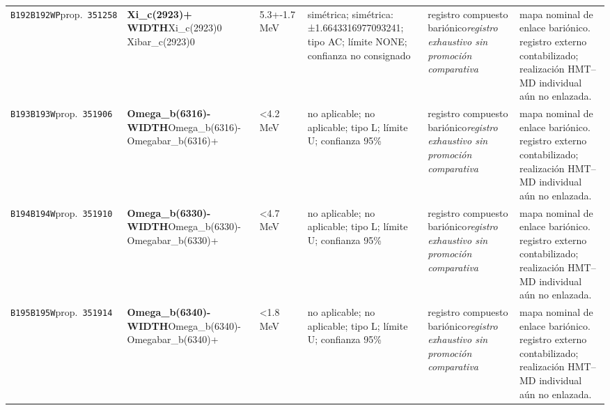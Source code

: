\begin{landscape}
\begin{longtable}{L{1.85cm}L{4.45cm}L{2.35cm}L{4.05cm}L{3.35cm}L{7.15cm}}
\texttt{B192}\newline \texttt{B192WP}\newline prop.\ \texttt{351258} & \textbf{Xi\_\allowbreak{}c(2923)+ WIDTH}\newline Xi\_\allowbreak{}c(2923)0 \textbar{}\allowbreak{} Xibar\_\allowbreak{}c(2923)0 & 5.3+-1.7\,MeV & simétrica; simétrica: ±1.6643316977093241; tipo AC; límite NONE; confianza no consignado & registro compuesto bariónico\newline \emph{registro exhaustivo sin promoción comparativa} & mapa nominal de enlace bariónico. registro externo contabilizado; realización HMT--MD individual aún no enlazada. \\
\texttt{B193}\newline \texttt{B193W}\newline prop.\ \texttt{351906} & \textbf{Omega\_\allowbreak{}b(6316)- WIDTH}\newline Omega\_\allowbreak{}b(6316)- \textbar{}\allowbreak{} Omegabar\_\allowbreak{}b(6316)+ & \textless{}4.2\,MeV & no aplicable; no aplicable; tipo L; límite U; confianza 95\% & registro compuesto bariónico\newline \emph{registro exhaustivo sin promoción comparativa} & mapa nominal de enlace bariónico. registro externo contabilizado; realización HMT--MD individual aún no enlazada. \\
\texttt{B194}\newline \texttt{B194W}\newline prop.\ \texttt{351910} & \textbf{Omega\_\allowbreak{}b(6330)- WIDTH}\newline Omega\_\allowbreak{}b(6330)- \textbar{}\allowbreak{} Omegabar\_\allowbreak{}b(6330)+ & \textless{}4.7\,MeV & no aplicable; no aplicable; tipo L; límite U; confianza 95\% & registro compuesto bariónico\newline \emph{registro exhaustivo sin promoción comparativa} & mapa nominal de enlace bariónico. registro externo contabilizado; realización HMT--MD individual aún no enlazada. \\
\texttt{B195}\newline \texttt{B195W}\newline prop.\ \texttt{351914} & \textbf{Omega\_\allowbreak{}b(6340)- WIDTH}\newline Omega\_\allowbreak{}b(6340)- \textbar{}\allowbreak{} Omegabar\_\allowbreak{}b(6340)+ & \textless{}1.8\,MeV & no aplicable; no aplicable; tipo L; límite U; confianza 95\% & registro compuesto bariónico\newline \emph{registro exhaustivo sin promoción comparativa} & mapa nominal de enlace bariónico. registro externo contabilizado; realización HMT--MD individual aún no enlazada. \\

\end{longtable}
\end{landscape}
